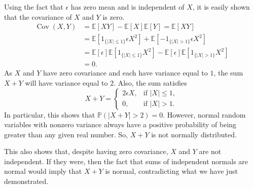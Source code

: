 \documentclass[12pt]{article}
\begin{document}
Using the fact that $\epsilon$ has zero mean and is independent of $X$, it is easily shown that the covariance of $X$ and $Y$ is zero.
\begin{equation*}
\begin{split}
\operatorname{Cov}(X,Y) &=\mathbb{E}[XY]-\mathbb{E}[X]\mathbb{E}[Y]=\mathbb{E}[XY]\\
&=\mathbb{E}\left[1_{\{|X|\le 1\}}\epsilon X^2\right] +\mathbb{E}\left[-1_{\{|X|> 1\}}\epsilon X^2\right]\\
&=\mathbb{E}[\epsilon]\mathbb{E}\left[1_{\{|X|\le 1\}}X^2\right] -\mathbb{E}[\epsilon]\mathbb{E}\left[1_{\{|X|> 1\}}X^2\right]\\
&=0.
\end{split}
\end{equation*}
As $X$ and $Y$ have zero covariance and each have variance equal to $1$, the sum $X+Y$ will have variance equal to $2$. Also, the sum satisfies
\begin{equation*}
X+Y=\left\{
\begin{array}{ll}
2\epsilon X,&\textrm{if }|X|\le 1,\\
0,&\textrm{if }|X|>1.
\end{array}
\right.
\end{equation*}
In particular, this shows that $\mathbb{P}(|X+Y|>2)=0$. However, normal random variables with nonzero variance always have a positive probability of being greater than any given real number. So, $X+Y$ is not normally distributed.

This also shows that, despite having zero covariance, $X$ and $Y$ are not independent. If they were, then the fact that sums of independent normals are normal would imply that $X+Y$ is normal, contradicting what we have just demonstrated.

\end{document}
